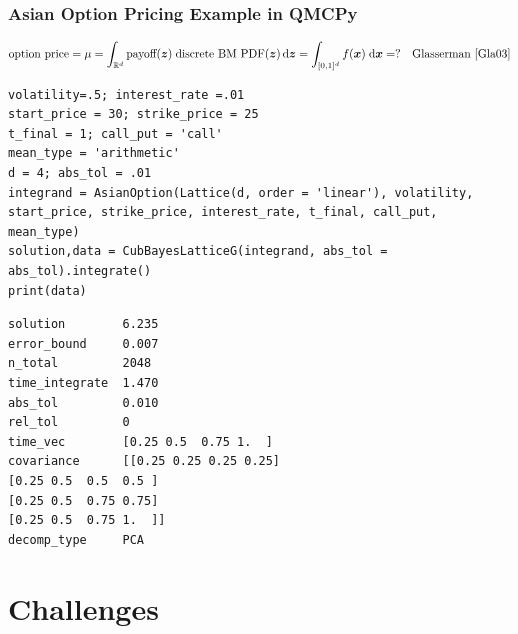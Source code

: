 \documentclass[11pt,compress,xcolor={usenames,dvipsnames},aspectratio=169]{beamer}
\begin{document}
\begin{frame}[fragile]\frametitle{Asian Option Pricing Example in QMCPy \href{https://colab.research.google.com/drive/1KrlrtLu7j8Ff7YsSJjPMiGUr-UKfqwxm?usp=sharing}{}}
	\vspace{-5ex}
	\[
	\text{option price} = \mu = \int_{\mathbb{R}^d} \text{payoff}(\boldsymbol{z}) \; \text{discrete BM PDF}(\boldsymbol{z})   \, {\rm d} \boldsymbol{z} = \int_{[0,1]^d} f(\boldsymbol{x}) \; {\rm d} \boldsymbol{x}  = ? \quad \text{Glasserman  \cite{Gla03}}
	\]
\noindent\begin{minipage}{0.52\textwidth}
\begin{lstlisting}[style=Python]
volatility=.5; interest_rate =.01
start_price = 30; strike_price = 25
t_final = 1; call_put = 'call'
mean_type = 'arithmetic'
d = 4; abs_tol = .01
integrand = AsianOption(Lattice(d, order = 'linear'), volatility, start_price, strike_price, interest_rate, t_final, call_put, mean_type)
solution,data = CubBayesLatticeG(integrand, abs_tol = abs_tol).integrate()
print(data)
\end{lstlisting}
\end{minipage} 
\qquad
\begin{minipage}{0.42\textwidth}
\begin{lstlisting}[style=Python]
solution        6.235
error_bound     0.007
n_total         2048
time_integrate  1.470
abs_tol         0.010
rel_tol         0
time_vec        [0.25 0.5  0.75 1.  ]
covariance      [[0.25 0.25 0.25 0.25]
[0.25 0.5  0.5  0.5 ]
[0.25 0.5  0.75 0.75]
[0.25 0.5  0.75 1.  ]]
decomp_type     PCA
\end{lstlisting}
\end{minipage} 
	
\end{frame}


\section{Challenges}
\end{document}
